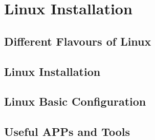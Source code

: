 \chapter{Linux Installation}

\section{Different Flavours of Linux}

\section{Linux Installation}

\section{Linux Basic Configuration}

\section{Useful APPs and Tools}
















